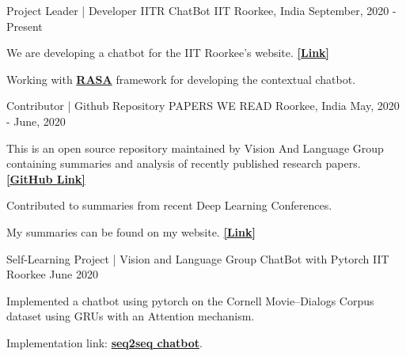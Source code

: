 

\begin{cventries}

  \cventry
    {Project Leader | Developer} %
    {IITR ChatBot} %
    {IIT Roorkee, India} %
    {September, 2020 - Present} %
    {
      \begin{cvitems} %
        \item {We are developing a chatbot for the IIT Roorkee's website. {\href{https://www.iitr.ac.in/}{\bf [Link]}}}
        \item {Working with {\href{https://rasa.com/}{\bf RASA}} framework for developing the contextual chatbot.}
      \end{cvitems}
    }
  \cventry
    {Contributor | Github Repository} %
    {PAPERS WE READ} %
    {Roorkee, India} %
    {May, 2020 - June, 2020} %
    {
      \begin{cvitems} %
        \item {This is an open source repository maintained by Vision And Language Group containing summaries and analysis of recently published research papers. {\href{https://github.com/vlgiitr/papers_we_read}{\bf [GitHub Link]}}}
        \item {Contributed to summaries from recent Deep Learning Conferences.}
        \item{My summaries can be found on my website. {\href{https://praeclarumjj3.github.io/project/summary_of_papers/}{\bf [Link]}}}
      \end{cvitems}
    }
    
\cventry
    {Self-Learning Project | Vision and Language Group} %
    {ChatBot with Pytorch} %
    {IIT Roorkee} %
    {June 2020} %
    {
      \begin{cvitems} %
        \item {Implemented a chatbot using pytorch on the Cornell Movie--Dialogs Corpus dataset using GRUs with an Attention mechanism.}
        \item {Implementation link: {\href{https://github.com/praeclarumjj3/Chatbot-with-Pytorch}{\bf seq2seq chatbot}}.}
      \end{cvitems}
    }
    

\end{cventries}
